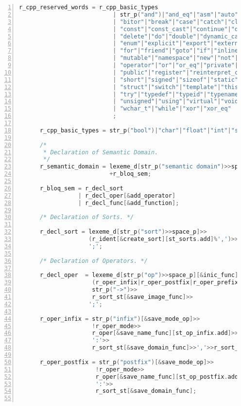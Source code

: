 \begin{lstlisting}[numbers=left,basicstyle=\tiny,language=C++,numberstyle=\tiny, numbersep=5pt]
      r_cpp_reserved_words = r_cpp_basic_types
                           | str_p("and")|"and_eq"|"asm"|"auto"|"bitand"
                           | "bitor"|"break"|"case"|"catch"|"class"|"compl"
                           | "const"|"const_cast"|"continue"|"default"
                           | "delete"|"do"|"double"|"dynamic_cast"|"else"
                           | "enum"|"explicit"|"export"|"extern"|"false"
                           | "for"|"friend"|"goto"|"if"|"inline"|"long"
                           | "mutable"|"namespace"|"new"|"not"|"not_eq"
                           | "operator"|"or"|"or_eq"|"private"|"protected"
                           | "public"|"register"|"reinterpret_cast"|"return"
                           | "short"|"signed"|"sizeof"|"static"|"static_cast"
                           | "struct"|"switch"|"template"|"this"|"throw"|"true"
                           | "try"|"typedef"|"typeid"|"typename"|"union"
                           | "unsigned"|"using"|"virtual"|"void"|"volatile"
                           | "wchar_t"|"while"|"xor"|"xor_eq"
                           ;

      r_cpp_basic_types = str_p("bool")|"char"|"float"|"int"|"string";

      /*
       * Declaration of Semantic Domain.
       */
      r_semantic_domain = lexeme_d[str_p("semantic domain")>>space_p]>>
                          +r_bloq_sem;

      r_bloq_sem = r_decl_sort
                 | r_decl_oper[&add_operator]
                 | r_decl_func[&add_function];

      /* Declaration of Sorts. */

      r_decl_sort = lexeme_d[str_p("sort")>>space_p]>>
                    (r_ident[&create_sort][st_sorts.add]%',')>>
                    ';';

      /* Declaration of Operators. */

      r_decl_oper  = lexeme_d[str_p("op")>>space_p][&inic_func]>>
                     (r_oper_infix|r_oper_postfix|r_oper_prefix)>>
                     str_p("->")>>
                     r_sort_st[&save_image_func]>>
                    ';';

      r_oper_infix = str_p("infix")[&save_mode_op]>>
                     !r_oper_mode>>
                     r_oper[&save_name_func][st_op_infix.add]>>
                     ':'>>
                     r_sort_st[&save_domain_func]>>','>>r_sort_st[&save_domain_func];

      r_oper_postfix = str_p("postfix")[&save_mode_op]>>
                      !r_oper_mode>>
                      r_oper[&save_name_func][st_op_postfix.add]>>
                      ':'>>
                      r_sort_st[&save_domain_func];


\end{lstlisting}
